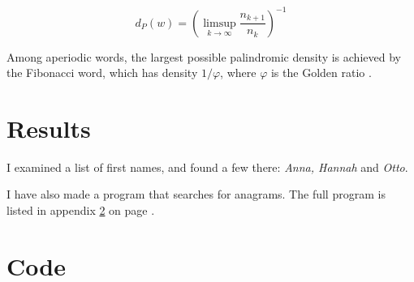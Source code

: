 \documentclass[thesis,fonts=libertine]{cluu}
\begin{document}
\begin{equation}
  d_P(w) =
  \left(\limsup\limits_{k\rightarrow\infty}\frac{n_{k+1}}{n_k} \right)^{-1}
\end{equation}

Among aperiodic words, the largest possible palindromic density is
achieved by the Fibonacci word, which has density \( 1/\varphi \), where
\( \varphi \)  is the Golden ratio \parencite[443]{adamczewski10}.

\chapter{Results}
\label{chap:results}

I examined a list of first names, and found a few there:
\emph{Anna, Hannah} and \emph{Otto}.

I have also made a program that searches for anagrams. The full
program is listed in appendix \ref{chap:code} on page
\pageref{chap:code}.

\appendix
\chapter{Code}
\label{chap:code}


\printbibliography
\end{document}

